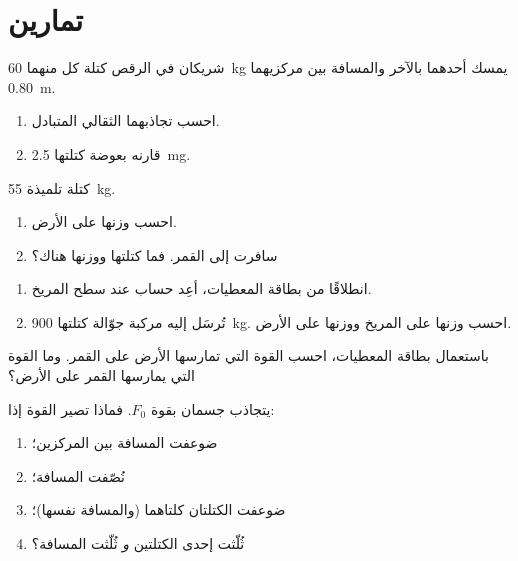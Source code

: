 \section{تمارين}

\begin{exercise}[$\star$]\label{exo:g10:universal-gravitation:1}
شريكان في الرقص كتلة كل منهما \qty{60}{kg} يمسك أحدهما بالآخر والمسافة بين مركزيهما
\qty{0.80}{m}.
\begin{enumerate}
  \item احسب تجاذبهما الثقالي المتبادل.
  \item قارنه  بعوضة كتلتها \qty{2.5}{mg}.
\end{enumerate}
\end{exercise}

\begin{exercise}[$\star$]\label{exo:g10:universal-gravitation:2}
كتلة تلميذة \qty{55}{kg}.
\begin{enumerate}
  \item احسب وزنها على الأرض.
  \item سافرت إلى القمر. فما كتلتها ووزنها
        هناك؟
\end{enumerate}
\end{exercise}

\begin{exercise}[$\star$]\label{exo:g10:universal-gravitation:3}
\begin{enumerate}
  \item انطلاقًا من بطاقة المعطيات، أعِد حساب 
        عند سطح المريخ.
  \item تُرسَل إليه مركبة جوّالة كتلتها \qty{900}{kg}. احسب وزنها على المريخ
        ووزنها على الأرض.
\end{enumerate}
\end{exercise}

\begin{exercise}[$\star$]\label{exo:g10:universal-gravitation:4}
باستعمال بطاقة المعطيات، احسب القوة التي تمارسها الأرض على
القمر. وما القوة التي يمارسها القمر على الأرض؟
\end{exercise}

\begin{exercise}[$\star$]\label{exo:g10:universal-gravitation:5}
يتجاذب جسمان بقوة $F_0$. فماذا تصير القوة إذا:
\begin{enumerate}
  \item ضوعفت المسافة بين المركزين؛
  \item نُصّفت المسافة؛
  \item ضوعفت الكتلتان كلتاهما (والمسافة نفسها)؛
  \item ثُلّثت إحدى الكتلتين \emph{و} ثُلّثت المسافة؟
\end{enumerate}
\end{exercise}

